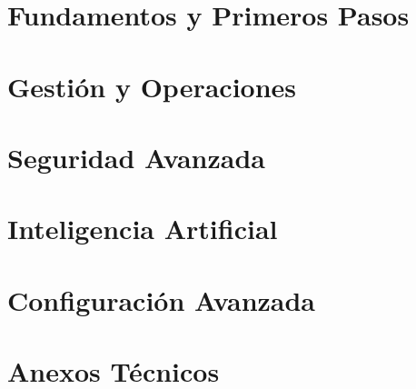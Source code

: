 \documentclass[
    11pt,
    oneside,
    openright,
    spanish,
    a4paper
]{book}
\begin{document}


\frontmatter
{}





\tableofcontents
\listoffigures
\listoftables

\mainmatter
{}

\part{Fundamentos y Primeros Pasos}



\part{Gestión y Operaciones}



\part{Seguridad Avanzada}


\part{Inteligencia Artificial}


\part{Configuración Avanzada}


\appendix
\part{Anexos Técnicos}


\backmatter
\printindex
\end{document}

